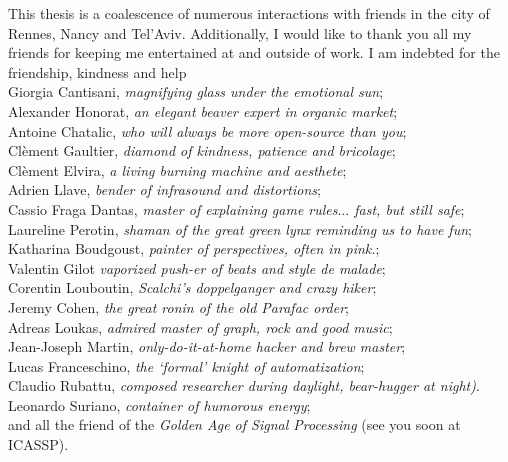\mynewline
This thesis is a coalescence of numerous interactions with friends in the city of Rennes, Nancy and Tel'Aviv.
Additionally, I would like to thank you all my friends for keeping me entertained at and outside of work.
I am indebted for the friendship, kindness and help{\small
\\\hspace*{0.3cm} Giorgia Cantisani, \textit{magnifying glass under the emotional sun};
\\\hspace*{0.3cm} Alexander Honorat, \textit{an elegant beaver expert in organic market};
\\\hspace*{0.3cm} Antoine Chatalic, \textit{who will always be more open-source than you};
\\\hspace*{0.3cm} Cl\`ement Gaultier, \textit{diamond of kindness, patience and bricolage};
\\\hspace*{0.3cm} Cl\`ement Elvira, \textit{a living burning machine and aesthete};
\\\hspace*{0.3cm} Adrien Llave, \textit{bender of infrasound and distortions};
\\\hspace*{0.3cm} Cassio Fraga Dantas, \textit{master of explaining game rules$\ldots$ fast, but still safe};
\\\hspace*{0.3cm} Laureline Perotin, \textit{shaman of the great green lynx reminding us to have fun};
\\\hspace*{0.3cm} Katharina Boudgoust, \textit{painter of perspectives, often in pink.};
\\\hspace*{0.3cm} Valentin Gilot \textit{vaporized push-er of beats and style de malade};
\\\hspace*{0.3cm} Corentin Louboutin, \textit{Scalchi's doppelganger and crazy hiker};
\\\hspace*{0.3cm} Jeremy Cohen, \textit{the great ronin of the old Parafac order};
\\\hspace*{0.3cm} Adreas Loukas, \textit{admired master of graph, rock and good music};
\\\hspace*{0.3cm} Jean-Joseph Martin, \textit{only-do-it-at-home hacker and brew master};
\\\hspace*{0.3cm} Lucas Franceschino, \textit{the `formal' knight of automatization};
\\\hspace*{0.3cm} Claudio Rubattu, \textit{composed researcher during daylight, bear-hugger at night)}.
\\\hspace*{0.3cm} Leonardo Suriano, \textit{container of humorous energy};
}
\\and all the friend of the \textit{Golden Age of Signal Processing} (see you soon at ICASSP).

